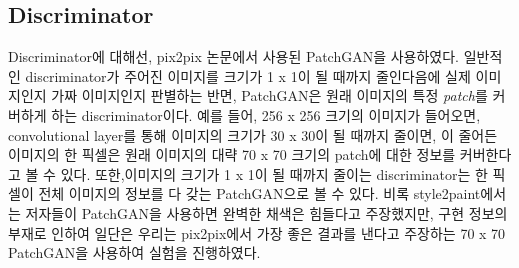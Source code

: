 \subsection{Discriminator}

Discriminator에 대해선, pix2pix 논문에서 사용된 PatchGAN을 사용하였다.
일반적인 discriminator가 주어진 이미지를 크기가 1 x 1이 될 때까지 줄인다음에 실제 이미지인지 가짜 이미지인지 판별하는 반면, PatchGAN은 원래 이미지의 특정 \textit{patch}를 커버하게 하는 discriminator이다.
예를 들어, 256 x 256 크기의 이미지가 들어오면, convolutional layer를 통해 이미지의 크기가 30 x 30이 될 때까지 줄이면, 이 줄어든 이미지의 한 픽셀은 원래 이미지의 대략 70 x 70 크기의 patch에 대한 정보를 커버한다고 볼 수 있다.
또한,이미지의 크기가 1 x 1이 될 때까지 줄이는 discriminator는 한 픽셀이 전체 이미지의 정보를 다 갖는 PatchGAN으로 볼 수 있다.
비록 style2paint에서는 저자들이 PatchGAN을 사용하면 완벽한 채색은 힘들다고 주장했지만, 구현 정보의 부재로 인하여 일단은 우리는 pix2pix에서 가장 좋은 결과를 낸다고 주장하는 70 x 70 PatchGAN을 사용하여 실험을 진행하였다.